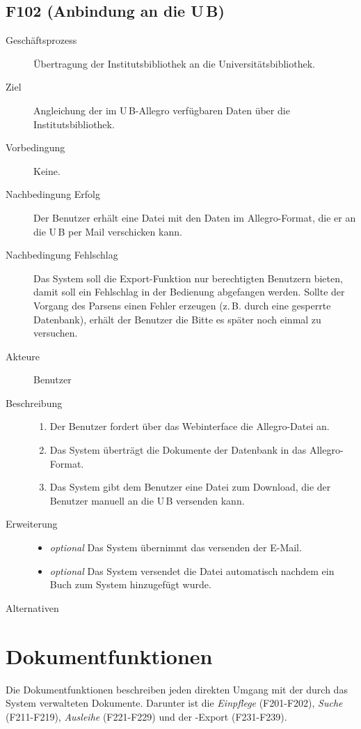 \subsection{F102 (Anbindung an die U\,B)}
\begin{description}
  \item[Geschäftsprozess]Übertragung der Institutsbibliothek an die Universitätsbibliothek.
  \item[Ziel]Angleichung der im U\,B-Allegro verfügbaren Daten über die Institutsbibliothek.
  \item[Vorbedingung]Keine.
  \item[Nachbedingung Erfolg]Der Benutzer erhält eine Datei mit den Daten im Allegro-Format, die er an die U\,B per Mail verschicken kann.
  \item[Nachbedingung Fehlschlag]Das System soll die Export-Funktion nur berechtigten Benutzern bieten, damit soll ein Fehlschlag in der Bedienung abgefangen werden. Sollte der Vorgang des Parsens einen Fehler erzeugen (z.\,B. durch eine gesperrte Datenbank), erhält der Benutzer die Bitte es später noch einmal zu versuchen.
  \item[Akteure]Benutzer
  \item[Beschreibung]\hfill
    \begin{enumerate}
      \item Der Benutzer fordert über das Webinterface die Allegro-Datei an.
      \item Das System überträgt die Dokumente der Datenbank in das Allegro-Format.
      \item Das System gibt dem Benutzer eine Datei zum Download, die der Benutzer manuell an die U\,B versenden kann.
    \end{enumerate}
  \item[Erweiterung]\hfill
    \begin{itemize}
      \item \emph{optional} Das System übernimmt das versenden der E-Mail.
      \item \emph{optional} Das System versendet die Datei automatisch nachdem ein Buch zum System hinzugefügt wurde.
    \end{itemize}
  \item[Alternativen]
\end{description}


\section{Dokumentfunktionen}
Die Dokumentfunktionen beschreiben jeden direkten Umgang mit der durch das System verwalteten Dokumente. Darunter ist die \emph{Einpflege} (F201-F202), \emph{Suche} (F211-F219), \emph{Ausleihe} (F221-F229) und der \BibTeX -Export (F231-F239).
